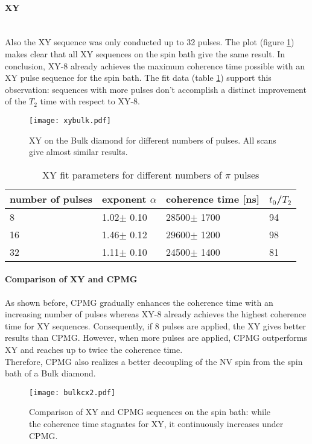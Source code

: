 \documentclass[12pt,a4paper]{article}
\begin{document}
\paragraph{XY}\mbox{}\\
Also the XY sequence was only conducted up to 32 pulses. The plot (figure \ref{xb}) makes clear that all XY sequences on the spin bath give the same result. In conclusion, XY-8 already achieves the maximum coherence time possible with an XY pulse sequence for the spin bath. The fit data (table \ref{x4b}) support this observation: sequences with more pulses don't accomplish a distinct improvement of the $T_2$ time with respect to XY-8.
\begin{figure}[H]
\texttt{[image: xybulk.pdf]} 
\caption{XY on the Bulk diamond for different numbers of pulses. All scans give almost similar results.}
\label{xb}
\end{figure}
\begin{table}[H]
\centering
\caption{XY fit parameters for different numbers of $\pi$ pulses}
\label{x4b}
\begin{tabular}{l|lll}
number of pulses &   exponent $\alpha$   & coherence time {[}ns{]}   & $t_0$/$T_2$   \\\hline
8                &   1.02$\pm$ 0.10      & 28500$\pm$ 1700                    & 94\\
16               &   1.46$\pm$ 0.12      & 29600$\pm$ 1200                     & 98 \\
32               &   1.11$\pm$ 0.10      & 24500$\pm$ 1400                     & 81
\end{tabular}
\end{table}

\paragraph{Comparison of XY and CPMG}
As shown before, CPMG gradually enhances the coherence time with an increasing number of pulses whereas XY-8 already achieves the highest coherence time for XY sequences. Consequently, if 8 pulses are applied, the XY gives better results than CPMG. However, when more pulses are applied, CPMG outperforms XY and reaches up to twice the coherence time. \\
Therefore, CPMG also realizes a better decoupling of the NV spin from the spin bath of a Bulk diamond.
\begin{figure}[H]
\centering
\texttt{[image: bulkcx2.pdf]} 
\caption{Comparison of XY and CPMG sequences on the spin bath: while the coherence time stagnates for XY, it continuously increases under CPMG.}
\label{xcb}
\end{figure}
\end{document}
